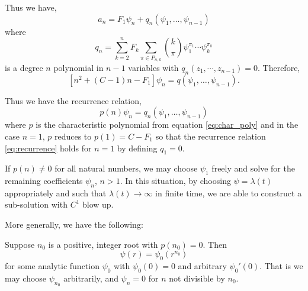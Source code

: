 \documentclass{amsart}
\begin{document}
Thus we have,
\[
a_n = F_1 \psi_n + q_n(\psi_1, \dots, \psi_{n-1})
\]
where
\[
q_n = \sum_{k=2}^n F_k \sum_{\pi \in P_{n,k}} {k \choose \pi} \psi_1^{\pi_1} \cdots \psi_k^{\pi_k}
\]
is a degree \(n\) polynomial in \(n-1\) variables with \(q_n(z_1, \cdots, z_{n-1}) = 0\). Therefore,
\[
\left[n^2 + (C-1) n - F_1\right] \psi_n =  q(\psi_1, \dots, \psi_{n-1}).
\]

Thus we have the recurrence relation,
\begin{equation}
\label{eq:recurrence}
p(n) \psi_n = q_n (\psi_1, \dots, \psi_{n-1})
\end{equation}
where \(p\) is the characteristic polynomial from equation \eqref{eq:char_poly} and in the case \(n=1\), \(p\) reduces to \(p(1) = C - F_1\) so that the recurrence relation \eqref{eq:recurrence} holds for \(n=1\) by defining \(q_1 = 0\).

If \(p(n) \ne 0\) for all natural numbers, we may choose \(\psi_1\) freely and solve for the remaining coefficients \(\psi_n\), \(n > 1\). In this situation, by choosing \(\psi = \lambda(t)\) appropriately and such that \(\lambda(t) \to \infty\) in finite time, we are able to construct a sub-solution with \(C^1\) blow up.

More generally, we have the following:

\begin{lemma}
Suppose \(n_0\) is a positive, integer root with \(p(n_0) = 0\). Then
\[
\psi(r) = \psi_0(r^{n_0})
\]
for some analytic function \(\psi_0\) with \(\psi_0(0) = 0\) and arbitrary \(\psi_0'(0)\). That is we may choose \(\psi_{n_0}\) arbitrarily, and \(\psi_n = 0\) for \(n\) not divisible by \(n_0\).
\end{lemma}
\end{document}
